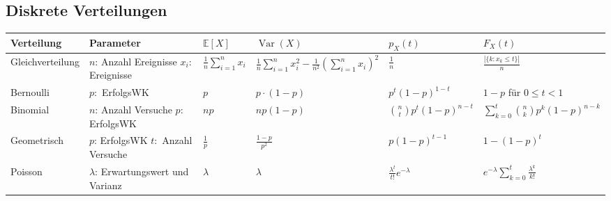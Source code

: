 \documentclass[a4paper,10pt]{article}
\def\E{\mathbb{E}}
\DeclareMathOperator{\Var}{\text{Var}}
\begin{document}
\subsection{Diskrete Verteilungen}
\begin{center}
	\begin{tabularx}{\textwidth}{llXXXX}
		\toprule
		Verteilung       & Parameter                                   & \( \E[X] \) & \( \Var(X) \)       & \( p_X(t) \)         & \( F_X(t) \)                     \\
		\midrule
		Gleichverteilung & \makecell[l]{\( n \): Anzahl Ereignisse                                                                                                   \\ \( x_i \): Ereignisse} & \( \frac{1}{n} \sum_{i=1}^{n} x_i \) & \( \frac{1}{n} \sum_{i=1}^{n} x_i^2 - \frac{1}{n^2} \left(\sum_{i=1}^{n} x_i \right)^2 \) & \( \frac{1}{n} \) & \( \frac{|\{k:x_k \leq t\}|}{n} \) \\

		Bernoulli        & \( p: \) ErfolgsWK                          & \( p \)     & \( p \cdot (1-p) \) & \( p^t(1-p)^{1-t} \) & \( 1-p \) für \( 0 \leq t < 1 \) \\

		Binomial         & \makecell[l] {\( n \): Anzahl Versuche                                                                                                    \\ \( p: \) ErfolgsWK } & \( np \) & \( np(1-p) \) & \( \binom{n}{t}p^t(1-p)^{n-t} \) & \( \sum_{k=0}^{t} \binom{n}{k} p^k(1-p)^{n-k} \)  \\

		Geometrisch      & \makecell[l] { \( p \): ErfolgsWK                                                                                                         \\ \( t: \) Anzahl Versuche} & \( \frac{1}{p} \) & \( \frac{1-p}{p^2} \) & \( p(1-p)^{t-1} \) & \( 1-(1-p)^t\) \\

		Poisson          & \makecell[l]{ \( \lambda \): Erwartungswert                                                                                               \\ und Varianz} & \( \lambda \) & \( \lambda \) & \( \frac{\lambda^t}{t!}e^{-\lambda} \) & \( e^{-\lambda} \sum_{k=0}^{t} \frac{\lambda^{k}}{k!} \) \\

		\bottomrule
	\end{tabularx}
\end{center}
\end{document}
